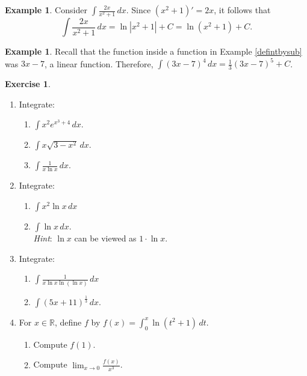 \documentclass[12pt,letterpaper]{book}
\numberwithin{equation}{section}
\theoremstyle{definition}
\newtheorem{example}[thm]{\textbf{Example}}
\newtheorem{exercise}{\textbf{Exercise}}[chapter]
\begin{document}
\begin{example}
Consider $\displaystyle{\int \frac{2x}{x^2+1}\,dx}$. Since $(x^2+1)'=2x$, it follows that
$$\int \frac{2x}{x^2+1}\,dx=\ln |x^2+1|+C=\ln(x^2+1)+C.$$
\end{example}

\begin{example}
Recall that the function inside a function in Example \ref{defintbysub} was $3x-7$, a linear function. Therefore, $\displaystyle{\int(3x-7)^4\,dx=\frac{1}{3}(3x-7)^5+C}$.
\end{example}

\begin{exercise} \quad
\begin{enumerate}[\bfseries 1.]

\item Integrate:
\begin{enumerate} \item $\displaystyle{\int x^2e^{x^3+4}\,dx}$.
\item $\displaystyle{\int x\sqrt{3-x^2}\,dx}$.
\item $\displaystyle{\int \frac{1}{x\ln x}\,dx}$.
\end{enumerate}
\item Integrate:
\begin{enumerate}
\item $\displaystyle{\int x^2 \ln x\,dx}$
\item $\displaystyle{\int \ln x\,dx}$. \\\textit{Hint}: $\ln x$ can be viewed as $1\cdot \ln x$.
\end{enumerate}
\item Integrate:
\begin{enumerate}
\item $\displaystyle{\int \frac{1}{x\ln x\ln(\ln x)} \,dx}$
\item $\displaystyle{\int (5x+11)^{\frac{1}{3}} \,dx}$.
\end{enumerate}
\item For $x\in \mathbb{R}$, define $f$ by $\displaystyle{f(x)=\int_0^x\ln(t^2+1)\,dt}$.
\begin{enumerate}
\item Compute $f(1)$.
\item Compute $\displaystyle{\lim_{x\to 0}\frac{f(x)}{x^3}}$.
\end{enumerate}

\end{enumerate}
\end{exercise}
\end{document}
